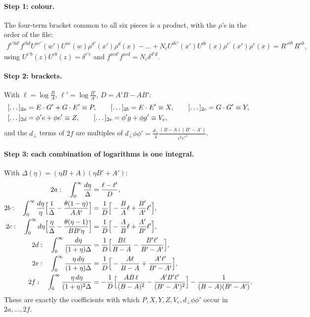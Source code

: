 \documentclass[10pt]{article}
\numberwithin{equation}{section}
\begin{document}
\paragraph{Step 1: colour.} The four-term bracket common to all six pieces is a product, with the $\rho$'s in the order of the file:
\begin{align}
f^{c'bd'}f^{cbd}U^{ac'}(w')U^{ac}(w)\rho^{d'}(x')\rho^{d}(x)-\dots+N_{c}U^{de'}(x')U^{de}(x)\rho^{e'}(x')\rho^{e}(x)=R'^{ab}\,R^{ab},
\end{align}
using $U^{c'b}(z)U^{cb}(z)=\delta^{c'c}$ and $f^{acd'}f^{acd}=N_{c}\delta^{d'd}$.

\paragraph{Step 2: brackets.} With $\ell=\log\frac{B}{A}$, $\ell'=\log\frac{B'}{A'}$, $D=A'B-AB'$:
\begin{align}
&[\dots]_{2a}=E\cdot G'+G\cdot E'\equiv P,\qquad[\dots]_{2b}=E\cdot E'\equiv X,\qquad[\dots]_{2c}=G\cdot G'\equiv Y,\notag\\
&[\dots]_{2d}=\phi'e+\phi e'\equiv Z,\qquad[\dots]_{2e}=\phi'g+\phi g'\equiv V_{e},
\end{align}
and the $d_{\perp}$ terms of $2f$ are multiples of $d_{\perp}\phi\phi'=\frac{d_{\perp}}{4}\frac{(B-A)(B'-A')}{c^{2}c'^{2}}$.

\paragraph{Step 3: each combination of logarithms is one integral.} With $\Delta(\eta)=(\eta B+A)(\eta B'+A')$:
\begin{align}
2a:\quad\int_{0}^{\infty}\frac{d\eta}{\Delta}&=\frac{\ell-\ell'}{D},\notag\\
2b:\quad\int_{0}^{\infty}\frac{d\eta}{\eta}\Big[\frac1\Delta-\frac{\theta(1-\eta)}{AA'}\Big]&=\frac1D\Big[-\frac BA\ell+\frac{B'}{A'}\ell'\Big],\notag\\
2c:\quad\int_{0}^{\infty}d\eta\Big[\frac\eta\Delta-\frac{\theta(\eta-1)}{BB'\eta}\Big]&=\frac1D\Big[-\frac AB\ell+\frac{A'}{B'}\ell'\Big],\notag\\
2d:\quad\int_{0}^{\infty}\frac{d\eta}{(1+\eta)\Delta}&=\frac1D\Big[\frac{B\ell}{B-A}-\frac{B'\ell'}{B'-A'}\Big],\notag\\
2e:\quad\int_{0}^{\infty}\frac{\eta\,d\eta}{(1+\eta)\Delta}&=\frac1D\Big[-\frac{A\ell}{B-A}+\frac{A'\ell'}{B'-A'}\Big],\notag\\
2f:\quad\int_{0}^{\infty}\frac{\eta\,d\eta}{(1+\eta)^{2}\Delta}&=-\frac1D\Big[\frac{AB\,\ell}{(B-A)^{2}}-\frac{A'B'\ell'}{(B'-A')^{2}}\Big]-\frac{1}{(B-A)(B'-A')}.
\end{align}
These are exactly the coefficients with which $P,X,Y,Z,V_{e},d_{\perp}\phi\phi'$ occur in $2a,\dots,2f$.
\end{document}
